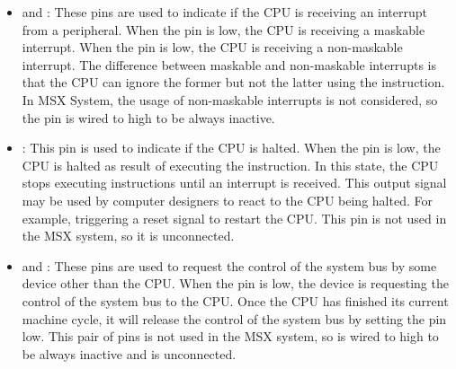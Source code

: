 \begin{itemize}
    \item {} and : These pins are used to indicate if the CPU is receiving an
    interrupt from a peripheral. When the  pin is low, the CPU is receiving a maskable
    interrupt. When the  pin is low, the CPU is receiving a non-maskable interrupt. The
    difference between maskable and non-maskable interrupts is that the CPU can ignore the former
    but not the latter using the  instruction. In MSX System, the usage of non-maskable
    interrupts is not considered, so the  pin is wired to high to be always inactive.
    \item {}: This pin is used to indicate if the CPU is halted. When the  pin is
    low, the CPU is halted as result of executing the  instruction. In this state, the CPU
    stops executing instructions until an interrupt is received. This output signal may be used by
    computer designers to react to the CPU being halted. For example, triggering a reset signal to
    restart the CPU. This pin is not used in the MSX system, so it is unconnected.
    \item {} and : These pins are used to request the control of the system
    bus by some device other than the CPU. When the  pin is low, the device is
    requesting the control of the system bus to the CPU. Once the CPU has finished its current
    machine cycle, it will release the control of the system bus by setting the  pin
    low. This pair of pins is not used in the MSX system, so  is wired to high to be
    always inactive and  is unconnected.
\end{itemize}

